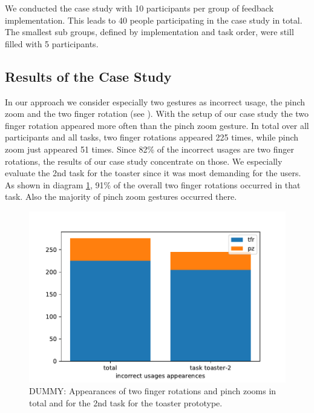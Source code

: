 \documentclass[11pt, a4paper]{article}
\begin{document}
			We conducted the case study with 10 participants per group of feedback implementation. This leads to 40 people participating in the case study in total. The smallest sub groups, defined by implementation and task order, were still filled with 5 participants.

		\subsection*{Results of the Case Study}\label{ssec:results}
			In our approach we consider especially two gestures as incorrect usage, the pinch zoom and the two finger rotation (see ). With the setup of our case study the two finger rotation appeared more often than the pinch zoom gesture. In total over all participants and all tasks, two finger rotations appeared 225 times, while pinch zoom just appeared 51 times. Since 82\% of the incorrect usages are two finger rotations, the results of our case study concentrate on those. We especially evaluate the 2nd task for the toaster since it was most demanding for the users. As shown in diagram \ref{fig:tfr_v_pz}, 91\% of the overall two finger rotations occurred in that task. Also the majority of pinch zoom gestures occurred there.

			\begin{figure}[H]
						\centering
						\includegraphics[width=.49\textwidth]{img/plot/plot_tfr_v_pz.pdf}
						\caption{DUMMY: Appearances of two finger rotations and pinch zooms in total and for the 2nd task for the toaster prototype.}
						\label{fig:tfr_v_pz}
					\end{figure}
\end{document}
